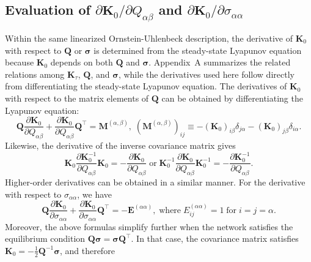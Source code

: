\subsection{Evaluation of $\partial \mathbf{K}_0/\partial Q_{\alpha\beta}$ and $\partial \mathbf{K}_0/\partial \sigma_{\alpha\alpha}$}
\quad Within the same linearized Ornstein-Uhlenbeck description, the derivative of $\mathbf{K}_0$ with respect to $\mathbf{Q}$ or $\boldsymbol{\sigma}$ is determined from the steady-state Lyapunov equation because $\mathbf{K}_0$ depends on both $\mathbf{Q}$ and $\boldsymbol{\sigma}$. Appendix~A summarizes the related relations among $\mathbf{K}_\tau$, $\mathbf{Q}$, and $\boldsymbol{\sigma}$, while the derivatives used here follow directly from differentiating the steady-state Lyapunov equation. The derivatives of $\mathbf{K}_0$ with respect to the matrix elements of $\mathbf{Q}$ can be obtained by differentiating the Lyapunov equation:
\begin{equation}
    \mathbf{Q} \frac{\partial \mathbf{K}_0}{\partial Q_{\alpha\beta}} + \frac{\partial \mathbf{K}_0}{\partial Q_{\alpha\beta}} \mathbf{Q}^\intercal = \mathbf{M}^{(\alpha,\beta)},\; (\mathbf{M}^{(\alpha,\beta)})_{ij} \equiv -(\mathbf{K}_0)_{i\beta} \delta_{j\alpha} - (\mathbf{K}_0)_{j\beta} \delta_{i\alpha}.
    \label{derivative_Ko}
\end{equation}
Likewise, the derivative of the inverse covariance matrix gives
\begin{equation}
    \mathbf{K}_0 \frac{\partial \mathbf{K}^{-1}_0}{\partial Q_{\alpha\beta}} \mathbf{K}_0 = - \frac{\partial \mathbf{K}_0}{\partial Q_{\alpha\beta}}\;\text{or}\;\mathbf{K}^{-1}_0 \frac{\partial \mathbf{K}_0}{\partial Q_{\alpha\beta}} \mathbf{K}^{-1}_0 = - \frac{\partial \mathbf{K}^{-1}_0}{\partial Q_{\alpha\beta}}.
    \label{inverse_partialKo}
\end{equation}
Higher-order derivatives can be obtained in a similar manner. For the derivative with respect to $\sigma_{\alpha\alpha}$, we have
\begin{equation}
    \mathbf{Q}\frac{\partial\mathbf{K}_0}{\partial\sigma_{\alpha\alpha}} + \frac{\partial\mathbf{K}_0}{\partial\sigma_{\alpha\alpha}}\mathbf{Q}^\intercal = -\mathbf{E}^{(\alpha\alpha)},\;\text{where}\;E^{(\alpha\alpha)}_{ij}=1\;\text{for}\;i=j=\alpha.
    \label{partialKo_sigma}
\end{equation}
Moreover, the above formulas simplify further when the network satisfies the equilibrium condition $\mathbf{Q}\boldsymbol{\sigma}=\boldsymbol{\sigma}\mathbf{Q}^\intercal$. In that case, the covariance matrix satisfies $\mathbf{K}_0 = -\frac{1}{2} \mathbf{Q}^{-1} \boldsymbol{\sigma}$, and therefore
